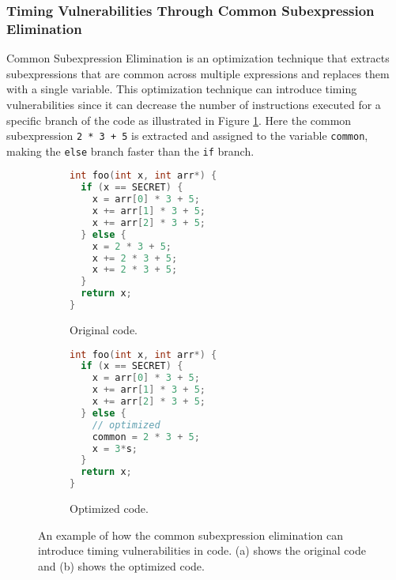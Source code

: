 \subsubsection{Timing Vulnerabilities Through Common Subexpression Elimination}
Common Subexpression Elimination is an optimization technique that extracts subexpressions that are common across multiple expressions and replaces them with a single variable.
This optimization technique can introduce timing vulnerabilities since it can decrease the number of instructions executed for a specific branch of the code as illustrated in Figure \ref{fig:common-subexpression-elimination}.
Here the common subexpression \texttt{2 * 3 + 5} is extracted and assigned to the variable \texttt{common}, making the \texttt{else} branch faster than the \texttt{if} branch.

\begin{figure}[H]
  \centering
     \begin{subfigure}[b]{0.3\textwidth}
        \begin{lstlisting}[style=defstyle, language=C]
int foo(int x, int arr*) {
  if (x == SECRET) {
    x = arr[0] * 3 + 5;
    x += arr[1] * 3 + 5;
    x += arr[2] * 3 + 5;
  } else {
    x = 2 * 3 + 5;
    x += 2 * 3 + 5;
    x += 2 * 3 + 5;
  }
  return x;
} \end{lstlisting} 
         \caption{Original code.}
    \end{subfigure}
    \hspace{1cm}
    \begin{subfigure}[b]{0.3\textwidth}
      \begin{lstlisting}[style=defstyle, language=C]
int foo(int x, int arr*) {
  if (x == SECRET) {
    x = arr[0] * 3 + 5;
    x += arr[1] * 3 + 5;
    x += arr[2] * 3 + 5;
  } else {
    // optimized
    common = 2 * 3 + 5;
    x = 3*s;
  }
  return x;
} \end{lstlisting} 
       \caption{Optimized code.}
  \end{subfigure}
  \caption{An example of how the common subexpression elimination can introduce timing vulnerabilities in code. (a) shows the original code and (b) shows the optimized code.}
  \label{fig:common-subexpression-elimination}
\end{figure}